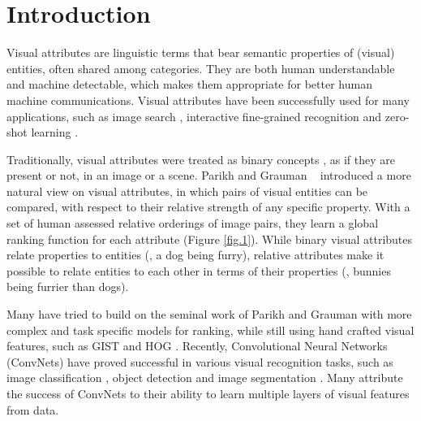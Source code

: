 

\section{Introduction}

 

Visual attributes are linguistic terms that bear semantic properties of (visual) entities, often shared among categories. They are both human understandable and machine detectable, which makes them appropriate for better human machine communications. Visual attributes have been successfully used for many applications, such as image search \cite{pubfig, whittlesearch}, interactive fine-grained recognition \cite{branson10, branson13} and zero-shot learning \cite{6571196, parikh2011}.

Traditionally, visual attributes were treated as binary concepts \cite{ferrari2007learning, Farhadi09describingobjects}, as if they are present or not, in an image or a scene. Parikh and Grauman ~\cite{parikh2011} introduced a more natural view on visual attributes, in which pairs of visual entities can be compared, with respect to their relative strength of any specific property. With a set of human assessed relative orderings of image pairs, they learn a global ranking function for each attribute (Figure \ref{fig.1}).
While binary visual attributes relate properties to entities (\eg, a dog being furry), relative attributes make it possible to relate entities to each other in terms of their properties (\eg, bunnies being furrier than dogs).

Many have tried to build on the seminal work of Parikh and Grauman \cite{parikh2011} with more complex and task specific models for ranking, while still using hand crafted visual features, such as GIST \cite{Aude01} and HOG \cite{hog}. Recently, Convolutional Neural Networks (ConvNets) have proved successful in various visual recognition tasks, such as image classification \cite{krizshevsky}, object detection \cite{RCNN} and image segmentation \cite{fullyconv}. Many attribute the success of ConvNets to their ability to learn multiple layers of visual features from data. 

